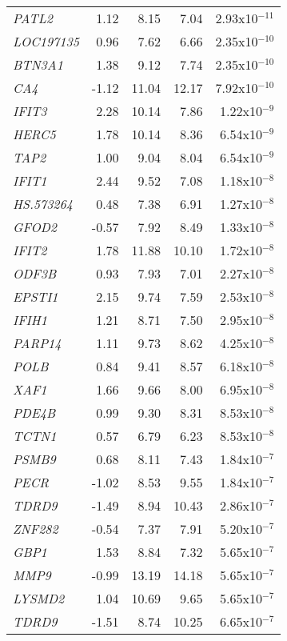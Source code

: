\begin{center}
\begin{longtable}[h]{ l r r r r }
\textit{PATL2} & 1.12 & 8.15 & 7.04 & 2.93x10$^{-11}$ \\
\textit{LOC197135} & 0.96 & 7.62 & 6.66 & 2.35x10$^{-10}$ \\
\textit{BTN3A1} & 1.38 & 9.12 & 7.74 & 2.35x10$^{-10}$ \\
\textit{CA4} & -1.12 & 11.04 & 12.17 & 7.92x10$^{-10}$ \\
\textit{IFIT3} & 2.28 & 10.14 & 7.86 & 1.22x10$^{-9}$ \\
\textit{HERC5} & 1.78 & 10.14 & 8.36 & 6.54x10$^{-9}$ \\
\textit{TAP2} & 1.00 & 9.04 & 8.04 & 6.54x10$^{-9}$ \\
\textit{IFIT1} & 2.44 & 9.52 & 7.08 & 1.18x10$^{-8}$ \\
\textit{HS.573264} & 0.48 & 7.38 & 6.91 & 1.27x10$^{-8}$ \\
\textit{GFOD2} & -0.57 & 7.92 & 8.49 & 1.33x10$^{-8}$ \\
\textit{IFIT2} & 1.78 & 11.88 & 10.10 & 1.72x10$^{-8}$ \\
\textit{ODF3B} & 0.93 & 7.93 & 7.01 & 2.27x10$^{-8}$ \\
\textit{EPSTI1} & 2.15 & 9.74 & 7.59 & 2.53x10$^{-8}$ \\
\textit{IFIH1} & 1.21 & 8.71 & 7.50 & 2.95x10$^{-8}$ \\
\textit{PARP14} & 1.11 & 9.73 & 8.62 & 4.25x10$^{-8}$ \\
\textit{POLB} & 0.84 & 9.41 & 8.57 & 6.18x10$^{-8}$ \\
\textit{XAF1} & 1.66 & 9.66 & 8.00 & 6.95x10$^{-8}$ \\
\textit{PDE4B} & 0.99 & 9.30 & 8.31 & 8.53x10$^{-8}$ \\
\textit{TCTN1} & 0.57 & 6.79 & 6.23 & 8.53x10$^{-8}$ \\
\textit{PSMB9} & 0.68 & 8.11 & 7.43 & 1.84x10$^{-7}$ \\
\textit{PECR} & -1.02 & 8.53 & 9.55 & 1.84x10$^{-7}$ \\
\textit{TDRD9} & -1.49 & 8.94 & 10.43 & 2.86x10$^{-7}$ \\
\textit{ZNF282} & -0.54 & 7.37 & 7.91 & 5.20x10$^{-7}$ \\
\textit{GBP1} & 1.53 & 8.84 & 7.32 & 5.65x10$^{-7}$ \\
\textit{MMP9} & -0.99 & 13.19 & 14.18 & 5.65x10$^{-7}$ \\
\textit{LYSMD2} & 1.04 & 10.69 & 9.65 & 5.65x10$^{-7}$ \\
\textit{TDRD9} & -1.51 & 8.74 & 10.25 & 6.65x10$^{-7}$ \\

\end{longtable}
\end{center}
